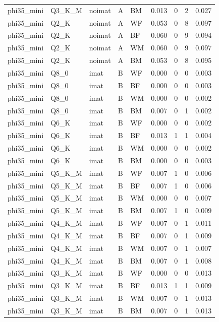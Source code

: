\begin{tabular}{lllllrrrr}
phi35\_mini & Q3\_K\_M & noimat & A & BM & 0.013 & 0 & 2 & 0.027 \\
phi35\_mini & Q2\_K & noimat & A & WF & 0.053 & 0 & 8 & 0.097 \\
phi35\_mini & Q2\_K & noimat & A & BF & 0.060 & 0 & 9 & 0.094 \\
phi35\_mini & Q2\_K & noimat & A & WM & 0.060 & 0 & 9 & 0.097 \\
phi35\_mini & Q2\_K & noimat & A & BM & 0.053 & 0 & 8 & 0.095 \\
phi35\_mini & Q8\_0 & imat & B & WF & 0.000 & 0 & 0 & 0.003 \\
phi35\_mini & Q8\_0 & imat & B & BF & 0.000 & 0 & 0 & 0.003 \\
phi35\_mini & Q8\_0 & imat & B & WM & 0.000 & 0 & 0 & 0.002 \\
phi35\_mini & Q8\_0 & imat & B & BM & 0.007 & 0 & 1 & 0.002 \\
phi35\_mini & Q6\_K & imat & B & WF & 0.000 & 0 & 0 & 0.002 \\
phi35\_mini & Q6\_K & imat & B & BF & 0.013 & 1 & 1 & 0.004 \\
phi35\_mini & Q6\_K & imat & B & WM & 0.000 & 0 & 0 & 0.002 \\
phi35\_mini & Q6\_K & imat & B & BM & 0.000 & 0 & 0 & 0.003 \\
phi35\_mini & Q5\_K\_M & imat & B & WF & 0.007 & 1 & 0 & 0.006 \\
phi35\_mini & Q5\_K\_M & imat & B & BF & 0.007 & 1 & 0 & 0.006 \\
phi35\_mini & Q5\_K\_M & imat & B & WM & 0.000 & 0 & 0 & 0.007 \\
phi35\_mini & Q5\_K\_M & imat & B & BM & 0.007 & 1 & 0 & 0.009 \\
phi35\_mini & Q4\_K\_M & imat & B & WF & 0.007 & 0 & 1 & 0.011 \\
phi35\_mini & Q4\_K\_M & imat & B & BF & 0.007 & 0 & 1 & 0.009 \\
phi35\_mini & Q4\_K\_M & imat & B & WM & 0.007 & 0 & 1 & 0.007 \\
phi35\_mini & Q4\_K\_M & imat & B & BM & 0.007 & 0 & 1 & 0.008 \\
phi35\_mini & Q3\_K\_M & imat & B & WF & 0.000 & 0 & 0 & 0.013 \\
phi35\_mini & Q3\_K\_M & imat & B & BF & 0.013 & 1 & 1 & 0.009 \\
phi35\_mini & Q3\_K\_M & imat & B & WM & 0.007 & 0 & 1 & 0.013 \\
phi35\_mini & Q3\_K\_M & imat & B & BM & 0.007 & 0 & 1 & 0.013 \\

\end{tabular}
